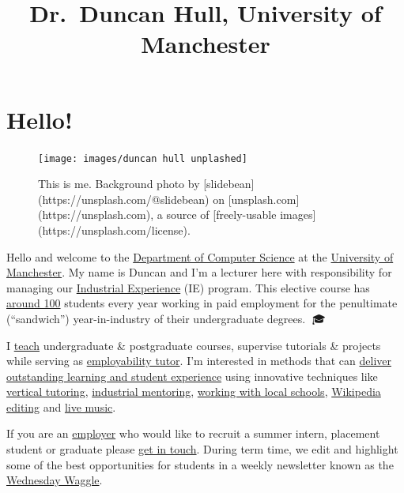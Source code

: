 \documentclass[
  12pt,
]{book}
\title{Dr.~Duncan Hull, University of Manchester}
\author{}
\date{\vspace{-2.5em}}
\begin{document}
\maketitle

{
\setcounter{tocdepth}{1}
\tableofcontents
}
\hypertarget{hello}{%
\chapter*{Hello!}\label{hello}}

\begin{figure}

{\centering \texttt{[image: images/duncan hull unplashed]} 

}

\caption{This is me. Background photo by [slidebean](https://unsplash.com/@slidebean) on [unsplash.com](https://unsplash.com), a source of [freely-usable images](https://unsplash.com/license).}\label{fig:unsplashed-fig}
\end{figure}

Hello and welcome to the \href{https://www.cs.manchester.ac.uk/}{Department of Computer Science} at the \href{https://www.manchester.ac.uk}{University of Manchester}. My name is Duncan and I'm a lecturer here with responsibility for managing our \href{https://www.cs.manchester.ac.uk/study/undergraduate/industrial-experience/}{Industrial Experience} (IE) program. This elective course has \protect\hyperlink{employability}{around 100} students every year working in paid employment for the penultimate (``sandwich'') year-in-industry of their undergraduate degrees. 🥪🎓

I \protect\hyperlink{teaching}{teach} undergraduate \& postgraduate courses, supervise tutorials \& projects while serving as \href{http://studentnet.cs.manchester.ac.uk/employment/placement/}{employability tutor}. I'm interested in methods that can \protect\hyperlink{research}{deliver outstanding learning and student experience} using innovative techniques like \protect\hyperlink{vertical-tutoring}{vertical tutoring}, \href{https://www.cs.manchester.ac.uk/connect/business-engagement/industrial-mentoring/}{industrial mentoring}, \protect\hyperlink{coding-their-future}{working with local schools}, \protect\hyperlink{wikipedia}{Wikipedia editing} and \protect\hyperlink{tuningcomplete}{live music}. 🎸

If you are an \protect\hyperlink{employers}{employer} who would like to recruit a summer intern, placement student or graduate please \protect\hyperlink{contact}{get in touch}. During term time, we edit and highlight some of the best opportunities for students in a weekly newsletter known as the \href{https://waggle.cs.manchester.ac.uk/waggle/about}{Wednesday Waggle}. 🐝
\end{document}
